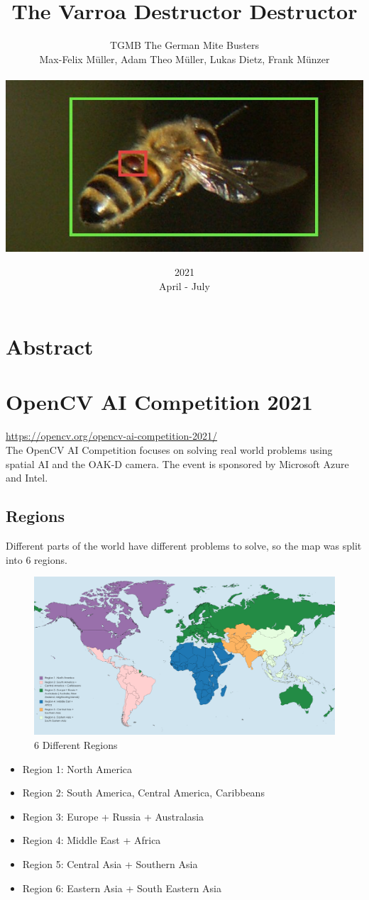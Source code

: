\documentclass[a4paper,titlepage]{article}
\title{The Varroa Destructor Destructor}
\date{2021\\ April - July}
\author{TGMB The German Mite Busters\\ Max-Felix Müller, Adam Theo Müller, Lukas Dietz, Frank Münzer\\ \\ \includegraphics[width=\textwidth]{Biene_mit_Varroa_erkannt.jpg}}
\begin{document}
\maketitle
\tableofcontents
\newpage
\listoffigures %
\listoftables %
\newpage

\section*{Abstract}

\newpage
\section{OpenCV AI Competition 2021}

\href{https://opencv.org/opencv-ai-competition-2021/}{https://opencv.org/opencv-ai-competition-2021/} \\

The OpenCV AI Competition focuses on solving real world problems using spatial AI and the OAK-D camera.
The event is sponsored by Microsoft Azure and Intel.

\subsection{Regions}

Different parts of the world have different problems to solve, so the map was split into 6 regions.

\begin{figure}[H]
    \includegraphics[width=\textwidth]{MapChart_Map-2048x1079.png}
    \caption{6 Different Regions}
\end{figure}

\begin{itemize}
    \item Region 1: North America
    \item Region 2: South America, Central America, Caribbeans
    \item Region 3: Europe + Russia + Australasia
    \item Region 4: Middle East + Africa
    \item Region 5: Central Asia + Southern Asia
    \item Region 6: Eastern Asia + South Eastern Asia
\end{itemize}
\end{document}
